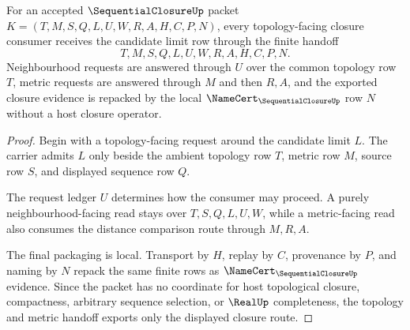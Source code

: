 \begin{theorem}
\label{thm:sequential-closure-topology-handoff}
For an accepted $\SequentialClosureUp$ packet $K=(T,M,S,Q,L,U,W,R,A,H,C,P,N)$, every topology-facing closure consumer receives the candidate limit row through the finite handoff
$$
T,M,S,Q,L,U,W,R,A,H,C,P,N .
$$
Neighbourhood requests are answered through $U$ over the common topology row $T$, metric requests are answered through $M$ and then $R,A$, and the exported closure evidence is repacked by the local $\NameCert_{\SequentialClosureUp}$ row $N$ without a host closure operator.
\end{theorem}
\begin{proof}
Begin with a topology-facing request around the candidate limit $L$. The carrier admits $L$ only beside the ambient topology row $T$, metric row $M$, source row $S$, and displayed sequence row $Q$.

The request ledger $U$ determines how the consumer may proceed. A purely neighbourhood-facing read stays over $T,S,Q,L,U,W$, while a metric-facing read also consumes the distance comparison route through $M,R,A$.

The final packaging is local. Transport by $H$, replay by $C$, provenance by $P$, and naming by $N$ repack the same finite rows as $\NameCert_{\SequentialClosureUp}$ evidence. Since the packet has no coordinate for host topological closure, compactness, arbitrary sequence selection, or $\RealUp$ completeness, the topology and metric handoff exports only the displayed closure route.
\end{proof}

